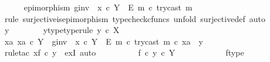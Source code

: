 \begin{isabellebody}
\isanewline
\isanewline
\ \ \ \ \isamarkupfalse%
\ {\isachardoublequoteopen}epimorphism\ {\isacharparenleft}{\kern0pt}g{\isacharunderscore}{\kern0pt}inv\ {\isasymamalg}\ {\isacharparenleft}{\kern0pt}x\ {\isasymcirc}\isactrlsub c\ {\isasymbeta}\isactrlbsub Y\ {\isasymsetminus}\ {\isacharparenleft}{\kern0pt}E{\isacharcomma}{\kern0pt}\ m{\isacharparenright}{\kern0pt}\isactrlesub {\isacharparenright}{\kern0pt}\ {\isasymcirc}\isactrlsub c\ try{\isacharunderscore}{\kern0pt}cast\ m{\isacharparenright}{\kern0pt}{\isachardoublequoteclose}\isanewline
\ \ \ \ \isamarkupfalse%
\ {\isacharparenleft}{\kern0pt}rule\ surjective{\isacharunderscore}{\kern0pt}is{\isacharunderscore}{\kern0pt}epimorphism{\isacharcomma}{\kern0pt}\ typecheck{\isacharunderscore}{\kern0pt}cfuncs{\isacharcomma}{\kern0pt}\ unfold\ surjective{\isacharunderscore}{\kern0pt}def{}{\isacharcomma}{\kern0pt}\ auto{\isacharparenright}{\kern0pt}\isanewline
\ \ \ \ \ \ \isamarkupfalse%
\ y\isanewline
\ \ \ \ \ \ \isamarkupfalse%
\ y{\isacharunderscore}{\kern0pt}type{\isacharbrackleft}{\kern0pt}type{\isacharunderscore}{\kern0pt}rule{\isacharbrackright}{\kern0pt}{\isacharcolon}{\kern0pt}\ {\isachardoublequoteopen}y\ {\isasymin}\isactrlsub c\ X{\isachardoublequoteclose}\isanewline
\isanewline
\ \ \ \ \ \ \isamarkupfalse%
\ {\isachardoublequoteopen}{\isasymexists}xa{\isachardot}{\kern0pt}\ xa\ {\isasymin}\isactrlsub c\ Y\ {\isasymand}\ {\isacharparenleft}{\kern0pt}g{\isacharunderscore}{\kern0pt}inv\ {\isasymamalg}\ {\isacharparenleft}{\kern0pt}x\ {\isasymcirc}\isactrlsub c\ {\isasymbeta}\isactrlbsub Y\ {\isasymsetminus}\ {\isacharparenleft}{\kern0pt}E{\isacharcomma}{\kern0pt}\ m{\isacharparenright}{\kern0pt}\isactrlesub {\isacharparenright}{\kern0pt}\ {\isasymcirc}\isactrlsub c\ try{\isacharunderscore}{\kern0pt}cast\ m{\isacharparenright}{\kern0pt}\ {\isasymcirc}\isactrlsub c\ xa\ {\isacharequal}{\kern0pt}\ y{\isachardoublequoteclose}\isanewline
\ \ \ \ \ \ \isamarkupfalse%
\ {\isacharparenleft}{\kern0pt}rule{\isacharunderscore}{\kern0pt}tac\ x{\isacharequal}{\kern0pt}{\isachardoublequoteopen}f\ {\isasymcirc}\isactrlsub c\ y{\isachardoublequoteclose}\ \ exI{\isacharcomma}{\kern0pt}\ auto{\isacharparenright}{\kern0pt}\isanewline
\isanewline
\ \ \ \ \ \ \ \ \isamarkupfalse%
\ {\isachardoublequoteopen}f\ {\isasymcirc}\isactrlsub c\ y\ {\isasymin}\isactrlsub c\ Y{\isachardoublequoteclose}\isanewline
\ \ \ \ \ \ \ \ \ \ \isamarkupfalse%
\ f{\isacharunderscore}{\kern0pt}type\ \isamarkupfalse%

\end{isabellebody}
